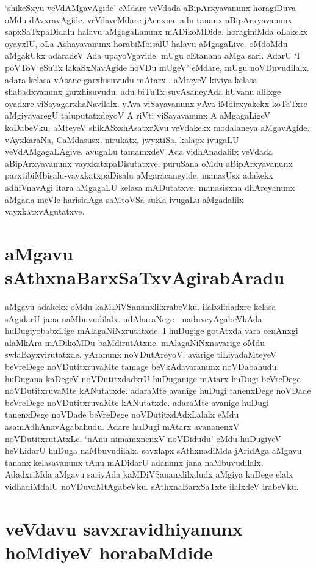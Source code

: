 `shikeSxyu veVdAMgavAgide' eMdare veVdada aBipArxyavanunx  horagiDuva oMdu dAvxravAgide. veVdaveMdare  jAcnxna. adu tananx aBipArxyavanunx  sapxSaTxpaDidalu halavu aMgagaLanunx mADikoMDide. horaginiMda oLakekx  oyayxlU, oLa Ashayavanunx  horabiMbisalU halavu aMgagaLive. oMdoMdu  aMgakUkx adaradeV Ada upayoVgavide. mUgu cEtanana aMga sari. AdarU `I poVToV eSuTx lakaSxNavAgide noVDu mUgeV' eMdare, mUgu noVDuvudilalx. adara kelasa vAsane garxhisuvudu mAtarx . aMteyeV kiviya kelasa shabadxvanunx garxhisuvudu. adu biTuTx suvAsaneyAda hUvanu alilxge oyadxre viSayagarxhaNavilalx. yAva viSayavanunx  yAva iMdirxyakekx  koTaTxre aMgiyavaregU taluputatxdeyoV A riVti viSayavanunx  A aMgagaLigeV koDabeVku. aMteyeV shikASxshAsatxrXvu veVdakekx  modalaneya aMgavAgide. vAyxkaraNa, CaMdasusx, nirukatx, jwyxtiSa, kalapx ivugaLU veVdAMgagaLAgive. avugaLu tamamxdeV Ada vidhAnadalilx veVdada aBipArxyavanunx  vayxkatxpaDisutatxve. puruSana oMdu aBipArxyavanunx parxtibiMbisalu-vayxkatxpaDisalu aMgaracaneyide. manasUsx  adakekx  adhiVnavAgi itara aMgagaLU kelasa mADutatxve. manasisxna dhAreyanunx  aMgada meVle harisidAga saMtoVSa-suKa ivugaLu aMgadalilx vayxkatxvAgutatxve. 

\section*{aMgavu sAthxnaBarxSaTxvAgirabAradu}

aMgavu adakekx  oMdu kaMDiVSananxlilxrabeVku. ilalxdidadxre kelasa sAgidarU jana naMbuvudilalx. udAharaNege- maduveyAgabeVkAda huDugiyobabxLige mAlagaNiNxrutatxde. I huDugige gotAtxda vara cenAnxgi alaMkAra mADikoMDu baMdirutAtxne. mAlagaNiNxnavarige oMdu swlaBayxvirutatxde. yAranunx  noVDutAreyoV, avarige tiLiyadaMteyeV beVreDege noVDutitxruvaMte tamage beVkAdavaranunx  noVDabahudu. huDugana kaDegeV noVDutitxdadxrU huDuganige  mAtarx huDugi beVreDege noVDutitxruvaMte kANutatxde. adaraMte avanige huDugi tanenxDege noVDade beVreDege noVDutitxruvaMte kANutatxde. adaraMte avanige huDugi tanenxDege noVDade beVreDege noVDutitxdAdxLalalx eMdu asamAdhAnavAgabahudu. Adare huDugi mAtarx avananenxV noVDutitxrutAtxLe. `nAnu nimamxnenxV noVDidudu' eMdu huDugiyeV heVLidarU huDuga  naMbuvudilalx. savxlapx sAthxnadiMda jAridAga aMgavu tananx kelasavanunx  tAnu mADidarU adanunx  jana naMbuvudilalx. AdadxriMda aMgavu sariyAda kaMDiVSananxlilxdudx aMgiya kaDege elalx vidhadiMdalU noVDuvaMtAgabeVku. sAthxnaBarxSaTxte ilalxdeV irabeVku.

\section*{veVdavu savxravidhiyanunx  hoMdiyeV horabaMdide}

